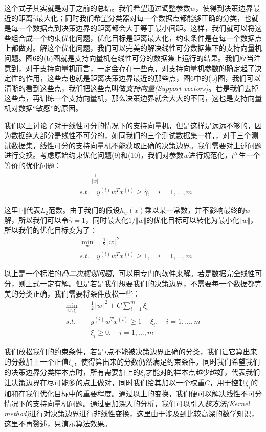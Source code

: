 \documentclass[UTF8, 12pt]{ctexart}
\begin{document}
这个式子其实就是对于之前的总结。我们希望通过调整参数$w$，使得到决策边界最近的距离$\hat{\gamma}$最大化；同时我们希望分类器对每一个数据点都能够正确的分类，也就是每一个数据点到决策边界的距离都会大于等于最小间距。这样，我们就可以将这些组合成一个约束优化问题，优化目标是距离最大化，约束条件是在每一个数据点上都做对。解这个优化问题，我们可以完美的解决线性可分数据集下的支持向量机问题。图6的(b)图就是支持向量机在线性可分的数据集上运行的结果。我们应当注意到，对于支持向量机而言，一定会存在一些点，对支持向量机参数的确定起了决定性的作用，这些点也就是距离决策边界最近的那些点，图6中的(b)图，我们可以清晰的看到这些点，我们把这些点叫做\emph{支持向量(Support vectors)}。若是我们去掉这些点，再训练一个支持向量机，那么决策边界就会大大的不同，这也是支持向量机对数据“敏感”的原因。

我们以上讨论了对于线性可分的情况下的支持向量机，但是这样是远远不够的，因为数据绝大部分是线性不可分的，如同我们的三个测试数据集一样，，对于三个测试数据集，线性可分的支持向量机不能获取正确的决策边界。我们需要对上述问题进行变换。考虑原始约束优化问题(9)和(10)，我们对参数$w$进行规范化，产生一个等价的优化问题：
\begin{align}
	& \mathop{\max_{w}} \quad \frac{\hat{\gamma}}{\Vert w \Vert} \\
	& s.t. \quad y^{(i)}w^{T}x^{(i)} \geq \hat{\gamma}, \quad i = 1,...,m
\end{align}

这里$\Vert · \Vert$代表$L_{2}$范数。由于我们的假设$h_{w}(x)$乘以某一常数，并不影响最终的$w$解，所以我们可以令$\hat{\gamma}=1$，同时最大化$1/\Vert w \Vert$的优化目标可以转化为最小化$\Vert w \Vert$，所以我们的优化目标变为了：
\begin{align}
	& \min_{w} \quad \frac{1}{2}{\Vert w \Vert}^{2} \\
	& s.t. \quad y^{(i)}w^{T}x^{(i)} \geq 1, \quad i = 1,...,m
\end{align}

以上是一个标准的\emph{凸二次规划问题}，可以用专门的软件来解。若是数据完全线性可分，则上式一定有解。但是若是我们想要我们的决策边界，不需要每一个数据都完美的分类正确，我们需要将条件放松一些：
\begin{align}
	\min_{w, \xi} & \quad \frac{1}{2}{\Vert w \Vert}^{2} + C\sum_{i=1}^{m}\xi_{i} \\
	s.t. & \quad y^{(i)}w^{T}x^{(i)} \geq 1 - \xi_{i}, \quad i = 1,...,m \\
	& \quad \xi_{i} \geq 0, \quad i = 1,...,m 
\end{align}

我们放松我们的约束条件，若是$i$点不能被决策边界正确的分类，我们让它算出来的分数加上一个正值$\xi_{i}$，使得算出来的分数仍然满足约束条件。同时我们希望我们的决策边界分类样本点时，所有需要加上的$\xi_{i}$才能对的样本点越少越好，代表我们让决策边界在尽可能多的点上做对，同时我们给其加以一个权重$C$，用于控制$\xi_{i}$的加和在我们优化目标中的重要程度。通过以上的变换，我们便可以解决线性不可分情况下的支持向量机问题。通过更加深入的分析，我们可以引入\emph{核方法(Kernel method)}进行对决策边界进行非线性变换，这里由于涉及到比较高深的数学知识，这里不再赘述，只演示算法效果。
\end{document}
